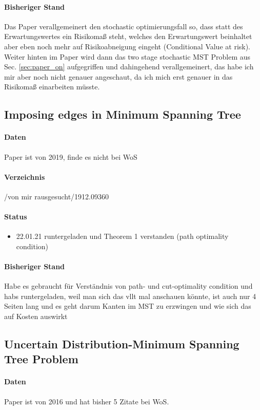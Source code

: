 \documentclass[paper=a4,10pt]{scrartcl}
\begin{document}
\paragraph{Bisheriger Stand} Das Paper verallgemeinert den stochastic optimierungsfall so, dass statt des Erwartungswertes ein Risikomaß steht, welches den Erwartungswert beinhaltet aber eben noch mehr auf Risikoabneigung eingeht (Conditional Value at risk). Weiter hinten im Paper wird dann das two stage stochastic MST Problem aus Sec. \ref{sec:paper_on} aufgegriffen und dahingehend verallgemeinert, das habe ich mir aber noch nicht genauer angeschaut, da ich mich erst genauer in das Risikomaß einarbeiten müsste.

\subsection{Imposing edges in Minimum Spanning Tree}
\label{sec:paper_impose}
\paragraph{Daten} Paper ist von 2019, finde es nicht bei WoS
\paragraph{Verzeichnis} /von mir rausgesucht/1912.09360
\paragraph{Status}
\begin{itemize}
\item 22.01.21 runtergeladen und Theorem 1 verstanden (path optimality condition)
\end{itemize}
\paragraph{Bisheriger Stand} Habe es gebraucht für Verständnis von path- und cut-optimality condition und habs runtergeladen, weil man sich das vllt mal anschauen könnte, ist auch nur 4 Seiten lang und es geht darum Kanten im MST zu erzwingen und wie sich das auf Kosten auswirkt


\subsection{Uncertain Distribution-Minimum Spanning Tree Problem}
\label{sec:paper_uncertain}
\paragraph{Daten} Paper ist von 2016 und hat bisher 5 Zitate bei WoS.
\end{document}
